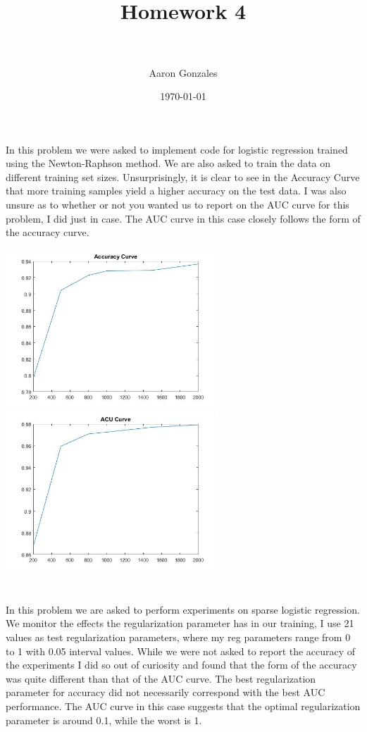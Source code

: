 \documentclass[paper=a4, fontsize=11pt]{scrartcl} %
\title{	
	\normalfont \normalsize 
	\horrule{0.5pt} \\[0.4cm] %
	\huge Homework 4 \\ %
	\horrule{2pt} \\[0.5cm] %
}
\author{Aaron Gonzales} %
\date{\normalsize\today} %
\numberwithin{equation}{section} %
\numberwithin{figure}{section} %
\numberwithin{table}{section} %
\begin{document}
	\maketitle
	\section{}
	In this problem we were asked to implement code for logistic regression trained using the Newton-Raphson method. We are also asked to train the data on different training set sizes. Unsurprisingly, it is clear to see in the Accuracy Curve that more training samples yield a higher accuracy on the test data. I was also unsure as to whether or not you wanted us to report on the AUC curve for this problem, I did just in case. The AUC curve in this case closely follows the form of the accuracy curve.  
	 
	\includegraphics[width=80mm]{acc1}
	\includegraphics[width=80mm]{auc1}
	\section{}
	In this problem we are asked to perform experiments on sparse logistic regression. We monitor the effects the regularization parameter has in our training, I use 21 values as test regularization parameters, where my reg parameters range from 0 to 1 with 0.05 interval values. While we were not asked to report the accuracy of the experiments I did so out of curiosity and found that the form of the accuracy was quite different than that of the AUC curve. The best regularization parameter for accuracy did not necessarily correspond with the best AUC performance. The AUC curve in this case suggests that the optimal regularization parameter is around 0.1, while the worst is 1. 
	
\end{document}
